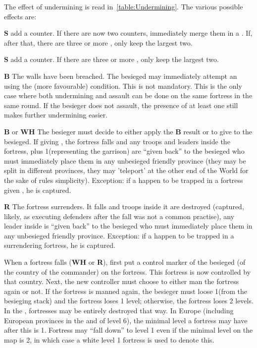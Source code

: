 The effect of undermining is read in~\ref{table:Undermining}. The various
possible effects are:
\begin{modlist}
\item[\textbf{S}\facemoins] add a \USURE\facemoins counter. If there are now
  two \USURE\facemoins counters, immediately merge them in a
  \USURE\faceplus. If, after that, there are three or more \USURE, only keep
  the largest two.
\item[\textbf{S}\faceplus] add a \USURE\faceplus counter. If there are three
  or more \USURE, only keep the largest two.
\item[\textbf{B}] The walls have been breached. The besieged may immediately
  attempt an  using the (more favourable) 
  condition. This  is not mandatory. This is the only case
  where both undermining and assault can be done on the same fortress in the
  same round. If the besieger does not assault, the presence of at least one
   still makes further undermining easier.
\item[\textbf{B} or \textbf{WH}] The besieger must decide to either apply the
  \textbf{B} result or to give  to the besieged. If giving
  , the fortress falls and any troops and leaders inside the
  fortress, plus 1\LD (representing the garrison) are ``given back'' to the
  besieged who must immediately place them in any unbesieged friendly province
  (they may be split in different provinces, they may 'teleport' at the other
  end of the World for the sake of rules simplicity). Exception: if a
   happen to be trapped in a fortress given ,
  he is captured.
\item[\textbf{R}] The fortress surrenders. It falls and troops inside it are
  destroyed (captured, likely, as executing defenders after the fall was not a
  common practise), any leader inside is ``given back'' to the besieged who
  must immediately place them in any unbesieged friendly province. Exception:
  if a  happen to be trapped in a surrendering fortress, he is
  captured.
\end{modlist}

When a fortress falls (\textbf{WH} or \textbf{R}), first put a control marker
of the besieged (of the country of the commander) on the fortress. This
fortress is now controlled by that country. Next, the new controller must
choose to either man the fortress again or not. If the fortress is manned
again, the besieger must loose 1\LD (from the besieging stack) and the
fortress loses 1 level; otherwise, the fortress loses 2 levels. In the \ROTW,
fortresses may be entirely destroyed that way. In Europe (including European
provinces in the \ROTW and \COL of level 6), the minimal level a fortress may
have after this is 1. Fortress may ``fall down'' to level 1 even if the
minimal level on the map is 2, in which case a white level 1 fortress is used
to denote this.

